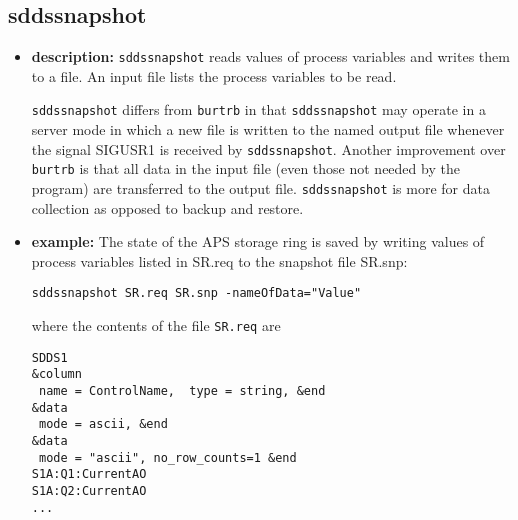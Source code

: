 %
%
\begin{latexonly}
\newpage
\end{latexonly}

%
%
\subsection{sddssnapshot}
\label{sddssnapshot}

\begin{itemize}
\item {\bf description:}
%
%
\verb+sddssnapshot+ reads values of process variables and writes them to a file.
An input file lists the process variables to be read.

\verb+sddssnapshot+ differs from \verb+burtrb+ in that \verb+sddssnapshot+  may operate in a server mode
in which a new file is written to the named output file whenever the signal SIGUSR1 is received 
by \verb+sddssnapshot+.
Another improvement over \verb+burtrb+ is that
all data in the input file (even those not needed by the program) are transferred to the output file.
\verb+sddssnapshot+ is more for data collection as opposed to backup and restore.

\item {\bf example:} 
%
% 
%
The state of the APS storage ring is saved by writing 
values of process variables listed in SR.req
to the snapshot file SR.snp:
\begin{verbatim}
sddssnapshot SR.req SR.snp -nameOfData="Value"
\end{verbatim}
where the contents of the file \verb+SR.req+ are
\begin{verbatim}
SDDS1
&column
 name = ControlName,  type = string, &end
&data
 mode = ascii, &end
&data
 mode = "ascii", no_row_counts=1 &end
S1A:Q1:CurrentAO
S1A:Q2:CurrentAO
...
\end{verbatim}


\end{itemize}
